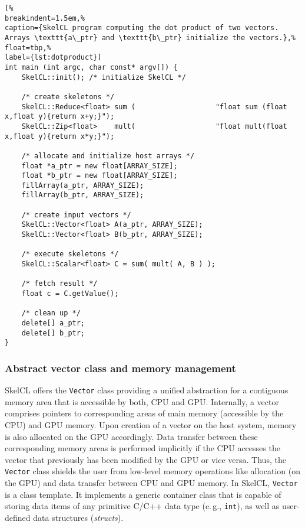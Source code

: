 \begin{lstlisting}[%
breakindent=1.5em,%
caption={SkelCL program computing the dot product of two vectors. Arrays \texttt{a\_ptr} and \texttt{b\_ptr} initialize the vectors.},%
float=tbp,%
label={lst:dotproduct}]
int main (int argc, char const* argv[]) {
    SkelCL::init(); /* initialize SkelCL */

    /* create skeletons */
    SkelCL::Reduce<float> sum (                   "float sum (float x,float y){return x+y;}");
    SkelCL::Zip<float>    mult(                   "float mult(float x,float y){return x*y;}");

    /* allocate and initialize host arrays */
    float *a_ptr = new float[ARRAY_SIZE];
    float *b_ptr = new float[ARRAY_SIZE];
    fillArray(a_ptr, ARRAY_SIZE);
    fillArray(b_ptr, ARRAY_SIZE);

    /* create input vectors */
    SkelCL::Vector<float> A(a_ptr, ARRAY_SIZE);
    SkelCL::Vector<float> B(b_ptr, ARRAY_SIZE);

    /* execute skeletons */
    SkelCL::Scalar<float> C = sum( mult( A, B ) );

    /* fetch result */
    float c = C.getValue();
    
    /* clean up */
    delete[] a_ptr;
    delete[] b_ptr;
}
\end{lstlisting}

\subsubsection{Abstract vector class and memory management}

SkelCL offers the \texttt{Vector} class providing a unified abstraction for a contiguous memory area that is accessible by both, CPU and GPU.
Internally, a vector comprises pointers to corresponding areas of main memory (accessible by the CPU) and GPU memory.
Upon creation of a vector on the host system, memory is also allocated on the GPU accordingly.
Data transfer between these corresponding memory areas is performed implicitly if the CPU accesses the vector that previously has been modified by the GPU or vice versa.
Thus, the \texttt{Vector} class shields the user from low-level memory operations like allocation (on the GPU) and data transfer between CPU and GPU memory.
In SkelCL, \texttt{Vector} is a class template.
It implements a generic container class that is capable of storing data items of any primitive C/C++ data type (e.\,g., \texttt{int}), as well as user-defined data structures (\emph{structs}).

